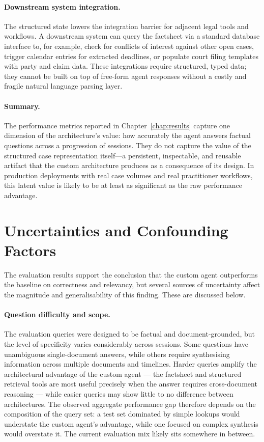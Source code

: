 \paragraph{Downstream system integration.}
The structured state lowers the integration barrier for adjacent legal tools and
workflows. A downstream system can query the factsheet via a standard database interface
to, for example, check for conflicts of interest against other open cases, trigger
calendar entries for extracted deadlines, or populate court filing templates with
party and claim data. These integrations require structured, typed data; they cannot be
built on top of free-form agent responses without a costly and fragile natural language
parsing layer.

\paragraph{Summary.}
The performance metrics reported in Chapter~\ref{chap:results} capture one dimension of
the architecture's value: how accurately the agent answers factual questions across a
progression of sessions. They do not capture the value of the structured case
representation itself—a persistent, inspectable, and reusable artifact that the custom
architecture produces as a consequence of its design. In production deployments with
real case volumes and real practitioner workflows, this latent value is likely to be
at least as significant as the raw performance advantage.

\section{Uncertainties and Confounding Factors}

The evaluation results support the conclusion that the custom agent outperforms the baseline on correctness and relevancy, but several sources of uncertainty affect the magnitude and generalisability of this finding. These are discussed below.

\paragraph{Question difficulty and scope.}
The evaluation queries were designed to be factual and document-grounded, but the level of specificity varies considerably across sessions. Some questions have unambiguous single-document answers, while others require synthesising information across multiple documents and timelines. Harder queries amplify the architectural advantage of the custom agent — the factsheet and structured retrieval tools are most useful precisely when the answer requires cross-document reasoning — while easier queries may show little to no difference between architectures. The observed aggregate performance gap therefore depends on the composition of the query set: a test set dominated by simple lookups would understate the custom agent's advantage, while one focused on complex synthesis would overstate it. The current evaluation mix likely sits somewhere in between.

